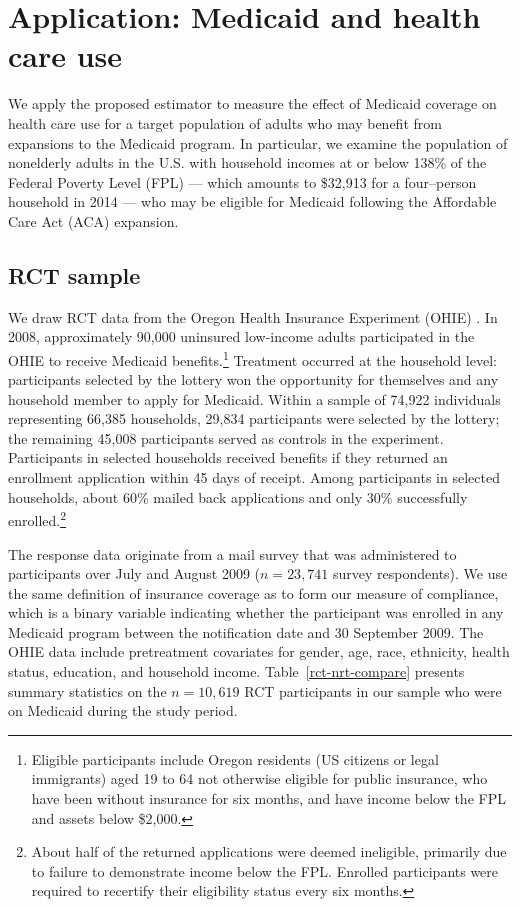 \documentclass[hidelinks,12pt]{article}
\begin{document}
{\section{Application: Medicaid and health care use} \label{application}

We apply the proposed estimator to measure the effect of Medicaid coverage on health care use for a target population of adults who may benefit from expansions to the Medicaid program. In particular, we examine the population of nonelderly adults in the U.S. with household incomes at or below 138\% of the Federal Poverty Level (FPL) --- which amounts to \$32,913 for a four--person household in 2014 --- who may be eligible for Medicaid following the Affordable Care Act (ACA) expansion.

\subsection{RCT sample} 

We draw RCT data from the Oregon Health Insurance Experiment (OHIE) \citep{finkelstein2012,baicker2013,baicker2014,Taubman}. In 2008, approximately 90,000 uninsured low-income adults participated in the OHIE to receive Medicaid benefits.\footnote{Eligible participants include Oregon residents (US citizens or legal immigrants) aged 19 to 64 not otherwise eligible for public insurance, who have been without insurance for six months, and have income below the FPL and assets below \$2,000.} Treatment occurred at the household level: participants selected by the lottery won the opportunity for themselves and any household member to apply for Medicaid. Within a sample of 74,922 individuals representing 66,385 households, 29,834 participants were selected by the lottery; the remaining 45,008 participants served as controls in the experiment. Participants in selected households received benefits if they returned an enrollment application within 45 days of receipt. Among participants in selected households, about 60\% mailed back applications and only 30\% successfully enrolled.\footnote{{\color{red}About half of the returned applications were deemed ineligible, primarily due to failure to demonstrate income below the FPL. Enrolled participants were required to recertify their eligibility status every six months.}}

The response data originate from a mail survey that was administered to participants over July and August 2009 ($n = 23,741$ survey respondents). We use the same definition of insurance coverage as \citet{finkelstein2012} to form our measure of compliance, which is a binary variable indicating whether the participant was enrolled in any Medicaid program between the notification date and 30 September 2009. The OHIE data include pretreatment covariates for gender, age, race, ethnicity, health status, education, and household income.  {\color{red}Table~\ref{rct-nrt-compare} presents summary statistics on the $n=10,619$ RCT participants in our sample who were on Medicaid during the study period.}

}
\end{document}
